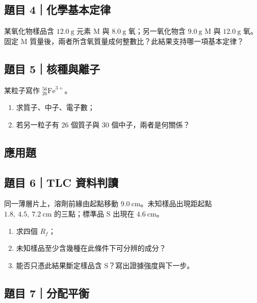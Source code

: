 \documentclass[11pt,a4paper]{article}
\providecommand{\tightlist}{%
  \setlength{\itemsep}{0pt}\setlength{\parskip}{0pt}}
\begin{document}
\subsection{題目 4｜化學基本定律}\label{ux984cux76ee-4ux5316ux5b78ux57faux672cux5b9aux5f8b}

某氧化物樣品含 \(12.0\ \mathrm g\) 元素 M 與 \(8.0\ \mathrm g\) 氧；另一氧化物含 \(9.0\ \mathrm g\) M 與 \(12.0\ \mathrm g\) 氧。固定 M 質量後，兩者所含氧質量成何整數比？此結果支持哪一項基本定律？

\subsection{題目 5｜核種與離子}\label{ux984cux76ee-5ux6838ux7a2eux8207ux96e2ux5b50}

某粒子寫作 \({}^{56}_{26}\mathrm{Fe}^{3+}\)。

\begin{enumerate}
\def\labelenumi{\arabic{enumi}.}
\tightlist
\item
  求質子、中子、電子數；
\item
  若另一粒子有 26 個質子與 30 個中子，兩者是何關係？
\end{enumerate}

\subsection{應用題}\label{ux61c9ux7528ux984c}

\subsection{題目 6｜TLC 資料判讀}\label{ux984cux76ee-6tlc-ux8cc7ux6599ux5224ux8b80}

同一薄層片上，溶劑前緣由起點移動 \(9.0\ \mathrm{cm}\)。未知樣品出現距起點 \(1.8,\ 4.5,\ 7.2\ \mathrm{cm}\) 的三點；標準品 S 出現在 \(4.6\ \mathrm{cm}\)。

\begin{enumerate}
\def\labelenumi{\arabic{enumi}.}
\tightlist
\item
  求四個 \(R_f\)；
\item
  未知樣品至少含幾種在此條件下可分辨的成分？
\item
  能否只憑此結果斷定樣品含 S？寫出證據強度與下一步。
\end{enumerate}

\subsection{題目 7｜分配平衡}\label{ux984cux76ee-7ux5206ux914dux5e73ux8861}
\end{document}
